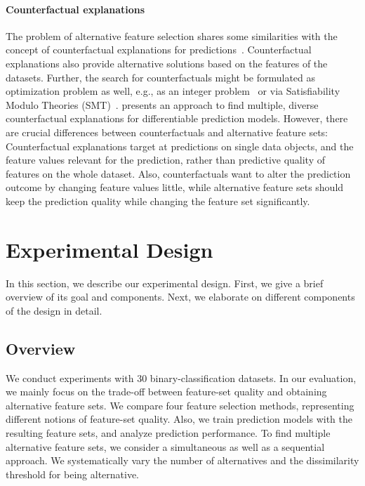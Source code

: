 \documentclass[conference]{IEEEtran}
\theoremstyle{definition}
\begin{document}
\paragraph{Counterfactual explanations}

The problem of alternative feature selection shares some similarities with the concept of counterfactual explanations for predictions~\cite{verma2020counterfactual, stepin2021survey}.
Counterfactual explanations also provide alternative solutions based on the features of the datasets.
Further, the search for counterfactuals might be formulated as optimization problem as well, e.g., as an integer problem~\cite{mohammadi2021scaling} or via Satisfiability Modulo Theories (SMT)~\cite{karimi2020model}.
\cite{mothilal2020explaining} presents an approach to find multiple, diverse counterfactual explanations for differentiable prediction models.
However, there are crucial differences between counterfactuals and alternative feature sets:
Counterfactual explanations target at predictions on single data objects, and the feature values relevant for the prediction, rather than predictive quality of features on the whole dataset.
Also, counterfactuals want to alter the prediction outcome by changing feature values little, while alternative feature sets should keep the prediction quality while changing the feature set significantly.

\section{Experimental Design}
\label{sec:experimental-design}

In this section, we describe our experimental design.
First, we give a brief overview of its goal and components.
Next, we elaborate on different components of the design in detail.

\subsection{Overview}
\label{sec:experimental-design:overview}

We conduct experiments with 30 binary-classification datasets.
In our evaluation, we mainly focus on the trade-off between feature-set quality and obtaining alternative feature sets.
We compare four feature selection methods, representing different notions of feature-set quality.
Also, we train prediction models with the resulting feature sets, and analyze prediction performance.
To find multiple alternative feature sets, we consider a simultaneous as well as a sequential approach.
We systematically vary the number of alternatives and the dissimilarity threshold for being alternative.
\end{document}
